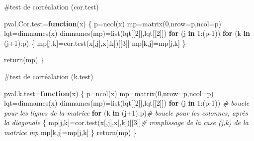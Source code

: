 \documentclass[
]{article}
\newenvironment{Shaded}{\begin{snugshade}}{\end{snugshade}}
\newcommand{\AttributeTok}[1]{\textcolor[rgb]{0.77,0.63,0.00}{#1}}
\newcommand{\CommentTok}[1]{\textcolor[rgb]{0.56,0.35,0.01}{\textit{#1}}}
\newcommand{\ControlFlowTok}[1]{\textcolor[rgb]{0.13,0.29,0.53}{\textbf{#1}}}
\newcommand{\DecValTok}[1]{\textcolor[rgb]{0.00,0.00,0.81}{#1}}
\newcommand{\FunctionTok}[1]{\textcolor[rgb]{0.00,0.00,0.00}{#1}}
\newcommand{\NormalTok}[1]{#1}
\newcommand{\OtherTok}[1]{\textcolor[rgb]{0.56,0.35,0.01}{#1}}
\newcommand{\SpecialCharTok}[1]{\textcolor[rgb]{0.00,0.00,0.00}{#1}}
\begin{document}
\#test de corréalation (cor.test)

\begin{Shaded}
\begin{Highlighting}[]
\NormalTok{pval.Cor.test}\OtherTok{=}\ControlFlowTok{function}\NormalTok{(x)}
\NormalTok{\{}
\NormalTok{    p}\OtherTok{=}\FunctionTok{ncol}\NormalTok{(x)}
\NormalTok{    mp}\OtherTok{=}\FunctionTok{matrix}\NormalTok{(}\DecValTok{0}\NormalTok{,}\AttributeTok{nrow=}\NormalTok{p,}\AttributeTok{ncol=}\NormalTok{p)}
\NormalTok{    lqt}\OtherTok{=}\FunctionTok{dimnames}\NormalTok{(x)}
    \FunctionTok{dimnames}\NormalTok{(mp)}\OtherTok{=}\FunctionTok{list}\NormalTok{(lqt[[}\DecValTok{2}\NormalTok{]],lqt[[}\DecValTok{2}\NormalTok{]])}
    \ControlFlowTok{for}\NormalTok{ (j }\ControlFlowTok{in} \DecValTok{1}\SpecialCharTok{:}\NormalTok{(p}\DecValTok{{-}1}\NormalTok{)) }
        \ControlFlowTok{for}\NormalTok{ (k }\ControlFlowTok{in}\NormalTok{ (j}\SpecialCharTok{+}\DecValTok{1}\NormalTok{)}\SpecialCharTok{:}\NormalTok{p)}
\NormalTok{        \{}
\NormalTok{        mp[j,k]}\OtherTok{=}\FunctionTok{cor.test}\NormalTok{(x[,j],x[,k])[[}\DecValTok{3}\NormalTok{]]}
\NormalTok{        mp[k,j]}\OtherTok{=}\NormalTok{mp[j,k]}
\NormalTok{        \}}

  \FunctionTok{return}\NormalTok{(mp)}
\NormalTok{\}}
\end{Highlighting}
\end{Shaded}

\#test de corréalation (k.test)

\begin{Shaded}
\begin{Highlighting}[]
\NormalTok{pval.k.test}\OtherTok{=}\ControlFlowTok{function}\NormalTok{(x)}
\NormalTok{\{}
\NormalTok{    p}\OtherTok{=}\FunctionTok{ncol}\NormalTok{(x)}
\NormalTok{    mp}\OtherTok{=}\FunctionTok{matrix}\NormalTok{(}\DecValTok{0}\NormalTok{,}\AttributeTok{nrow=}\NormalTok{p,}\AttributeTok{ncol=}\NormalTok{p)}
\NormalTok{    lqt}\OtherTok{=}\FunctionTok{dimnames}\NormalTok{(x)}
    \FunctionTok{dimnames}\NormalTok{(mp)}\OtherTok{=}\FunctionTok{list}\NormalTok{(lqt[[}\DecValTok{2}\NormalTok{]],lqt[[}\DecValTok{2}\NormalTok{]])}
    \ControlFlowTok{for}\NormalTok{ (j }\ControlFlowTok{in} \DecValTok{1}\SpecialCharTok{:}\NormalTok{(p}\DecValTok{{-}1}\NormalTok{)) }\CommentTok{\# boucle pour les lignes de la matrice}
        \ControlFlowTok{for}\NormalTok{ (k }\ControlFlowTok{in}\NormalTok{ (j}\SpecialCharTok{+}\DecValTok{1}\NormalTok{)}\SpecialCharTok{:}\NormalTok{p)}\CommentTok{\# boucle pour les colonnes, après la diagonale}
\NormalTok{        \{}
\NormalTok{        mp[j,k]}\OtherTok{=}\FunctionTok{cor.test}\NormalTok{(x[,j],x[,k])[[}\DecValTok{3}\NormalTok{]]}\CommentTok{\# remplissage de la case (j,k) de la matrice mp}
\NormalTok{        mp[k,j]}\OtherTok{=}\NormalTok{mp[j,k]}
\NormalTok{        \}}
\FunctionTok{return}\NormalTok{(mp)}
\NormalTok{\}}
\end{Highlighting}
\end{Shaded}
\end{document}
